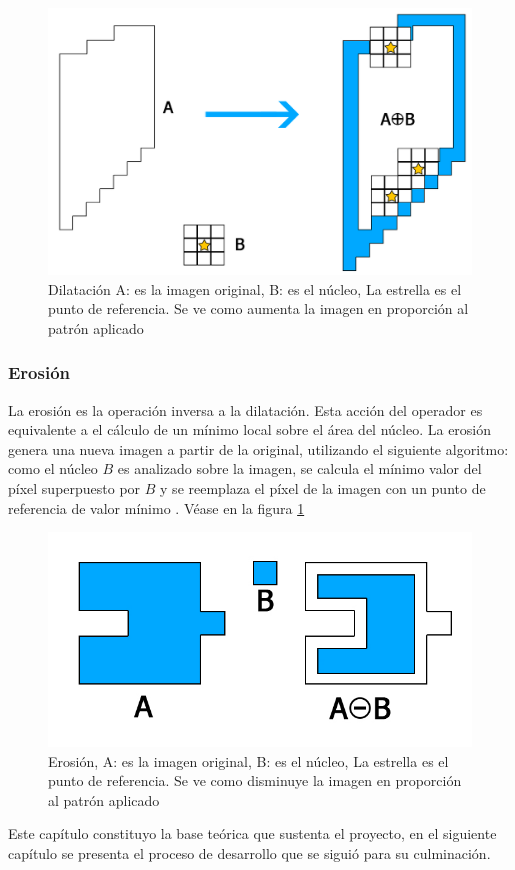 \begin{figure}[hbtp]

\centering
\includegraphics[scale=0.2]{imagenes/erosion-model.jpg}
\caption{Dilatación A: es la imagen original, B: es el n\'ucleo, La estrella es el punto de referencia. Se ve como aumenta la imagen en proporci\'on al patr\'on aplicado }
\end{figure}

\subsubsection{Erosión}
La erosión es la operación inversa a la dilatación. Esta acción del operador es equivalente a el cálculo de un mínimo local sobre el área del núcleo. La erosión genera una nueva imagen a partir de la original, utilizando el siguiente algoritmo: como el núcleo $B$ es analizado sobre la imagen, se calcula el mínimo valor del píxel superpuesto por $B$ y se reemplaza el píxel de la imagen con un punto de referencia de valor mínimo \cite{BookOpenCv}. 
V\'ease en la figura \ref{fig:erosion}

\begin{figure}[hbtp]
\centering
\includegraphics[scale=0.3]{imagenes/erosion.jpg}
\caption{Erosión,  A: es la imagen original, B: es el n\'ucleo, La estrella es el punto de referencia. Se ve como disminuye la imagen en proporci\'on al patr\'on aplicado}
\label{fig:erosion}
\end{figure}

Este cap\'itulo constituyo la base te\'orica que sustenta el proyecto, en el siguiente cap\'itulo se presenta el proceso de desarrollo que se sigui\'o para su culminaci\'on. 
